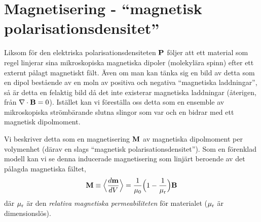 \section{Magnetisering - ``magnetisk polarisationsdensitet''}
Liksom f{\"o}r den elektriska polarisationsdensiteten ${\bf P}$ f{\"o}ljer att
ett material som regel linjerar sina mikroskopiska magnetiska dipoler
(molekyl{\"a}ra spinn) efter ett externt p{\aa}lagt magnetiskt f{\"a}lt.
{\"A}ven om man kan t{\"a}nka sig en bild av detta som en dipol best{\aa}ende
av en moln av positiva och negativa ``magnetiska laddningar'', s{\aa} {\"a}r
detta en felaktig bild d{\aa} det inte existerar magnetiska laddningar
({\aa}terigen, fr{\aa}n $\nabla\cdot{\bf B}=0$). Ist{\"a}llet kan vi
f{\"o}rest{\"a}lla oss detta som en ensemble av mikroskopiska
str{\"o}mb{\"a}rande slutna slingor som var och en bidrar med ett magnetisk
dipolmoment.
\bigskip\centerline{}\medskip
\noindent
Vi beskriver detta som en magnetisering ${\bf M}$ av magnetiska dipolmoment
per volymenhet (d{\"a}rav en slags ``magnetisk polarisationsdensitet'').
Som en f{\"o}renklad modell kan vi se denna inducerade magnetisering
som linj{\"a}rt beroende av det p{\aa}lagda magnetiska f{\"a}ltet,
$$
  {\bf M} \equiv \Big\langle{{d{\bf m}}\over{dV}}\Big\rangle
    = {{1}\over{\mu_0}}\Big(1-{{1}\over{\mu_{\rm r}}}\Big){\bf B}
$$
d{\"a}r $\mu_{\rm r}$ {\"a}r den {\it relativa magnetiska permeabiliteten}
f{\"o}r materialet ($\mu_{\rm r}$ {\"a}r dimensionsl{\"o}s).

